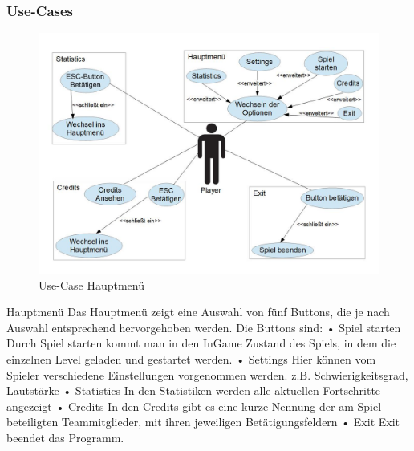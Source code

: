 \documentclass{article}
\begin{document}
\newpage

\subsubsection{Use-Cases}


\begin{figure}
	\centering
	\includegraphics[width=1\textwidth]{UCM}
	\caption{Use-Case Hauptmenü 
		\label{fig:UCM}}
\end{figure}

Hauptmenü\newline
Das Hauptmenü zeigt eine Auswahl von fünf Buttons, die je nach Auswahl entsprechend hervorgehoben werden.
 Die Buttons sind:\newline
• Spiel starten\newline
Durch Spiel starten kommt man in den InGame Zustand des Spiels, in dem die einzelnen Level geladen und gestartet werden. \newline
• Settings \newline
Hier können vom Spieler verschiedene Einstellungen vorgenommen werden.
z.B. Schwierigkeitsgrad, Lautstärke \newline
• Statistics \newline
In den Statistiken werden alle aktuellen Fortschritte angezeigt \newline
• Credits \newline
In den Credits gibt es eine kurze Nennung der am Spiel beteiligten Teammitglieder, mit ihren jeweiligen Betätigungsfeldern \newline
• Exit\newline
Exit beendet das Programm. \newline
\end{document}
